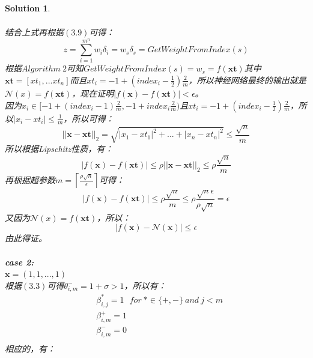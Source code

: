 \documentclass[a4paper,UTF8]{article}
\numberwithin{equation}{section}
\newtheorem*{solution}{Solution}
\begin{document}
\begin{solution}
\begin{enumerate}[ {(}1{)}]
\begin{equation}
\begin{aligned}
\end{aligned}
\end{equation}
结合上式再根据$(3.9)$可得：
\begin{equation}
z = \sum_{i=1}^{m^n}w_i\delta_i = w_s\delta_s = GetWeightFromIndex(s)
\end{equation}
根据$Algorithm\ 2$可知$GetWeightFromIndex(s) = w_s = f(\mathbf{xt})$其中$\mathbf{xt} = [xt_1,...xt_n]$而且$xt_i=-1 + (index_i - \frac{1}{2})\frac{2}{m}$，所以神经网络最终的输出就是$\mathcal{N}(x) = f(\mathbf{xt})$，现在证明$|f(\mathbf{x})-f(\mathbf{xt})| < \epsilon$。\\
因为$x_i \in [-1+(index_i - 1)\frac{2}{m},-1 + index_i\frac{2}{m})$且$xt_i=-1 + (index_i - \frac{1}{2})\frac{2}{m}$，所以$|x_i - xt_i|\leq \frac{1}{m}$，所以可得：
\begin{equation}
||\mathbf{x} - \mathbf{xt}||_2 = \sqrt{|x_1 - xt_1|^2 + ...+|x_n-xt_n|^2} \leq \frac{\sqrt{n}}{m}
\end{equation}
所以根据Lipschitz性质，有：
\begin{equation}
|f(\mathbf{x}) - f(\mathbf{xt})| \leq \rho||\mathbf{x} - \mathbf{xt}||_2  \leq \rho\frac{\sqrt{n}}{m}
\end{equation}
再根据超参数$m=\left\lceil\frac{\rho\sqrt{n}}{\epsilon}\right\rceil$可得：
\begin{equation}
|f(\mathbf{x}) - f(\mathbf{xt})| \leq \rho\frac{\sqrt{n}}{m} \leq \rho\frac{\sqrt{n}\epsilon}{\rho\sqrt{n}} = \epsilon
\end{equation}
又因为$\mathcal{N}(x) = f(\mathbf{xt})$，所以：
\begin{equation}
|f(\mathbf{x}) - \mathcal{N}(\mathbf{x})| \leq \epsilon
\end{equation}
由此得证。\\\\
\textbf{case 2:}\\
$\mathbf{x} = (1,1,...,1)$\\
根据$(3.3)$可得$\theta_{i,m}^- = 1+\sigma > 1$，所以有：
\begin{equation}
\begin{aligned}
&\beta_{i,j}^* = 1\ \ \ for\ *\in \{+,-\}\ and\ j < m\\
&\beta_{i,m}^+ = 1\\
&\beta_{i,m}^- = 0\\
\end{aligned}
\end{equation}
相应的，有：
\begin{equation}
\begin{aligned}

\end{aligned}
\end{equation}
\end{enumerate}
\end{solution}
\end{document}
